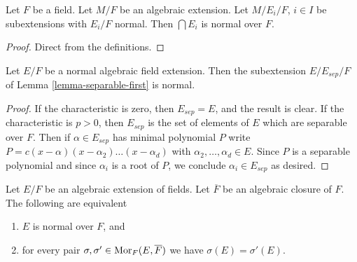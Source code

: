 \begin{lemma}
\label{lemma-intersect-normal}
Let $F$ be a field. Let $M/F$ be an algebraic extension. Let
$M/E_i/F$, $i \in I$ be subextensions with
$E_i/F$ normal. Then $\bigcap E_i$ is normal over $F$.
\end{lemma}

\begin{proof}
Direct from the definitions.
\end{proof}

\begin{lemma}
\label{lemma-separable-first-normal}
Let $E/F$ be a normal algebraic field extension. Then the subextension
$E/E_{sep}/F$ of Lemma \ref{lemma-separable-first} is normal.
\end{lemma}

\begin{proof}
If the characteristic is zero, then $E_{sep} = E$, and the result
is clear. If the characteristic is $p > 0$, then $E_{sep}$
is the set of elements of $E$ which are separable over $F$.
Then if $\alpha \in E_{sep}$ has minimal polynomial $P$
write $P = c(x - \alpha)(x - \alpha_2) \ldots (x - \alpha_d)$
with $\alpha_2, \ldots, \alpha_d \in E$. Since
$P$ is a separable polynomial and since $\alpha_i$
is a root of $P$, we conclude $\alpha_i \in E_{sep}$ as desired.
\end{proof}

\begin{lemma}
\label{lemma-characterize-normal}
Let $E/F$ be an algebraic extension of fields. Let $\overline{F}$ be an
algebraic closure of $F$. The following are equivalent
\begin{enumerate}
\item $E$ is normal over $F$, and
\item for every pair $\sigma, \sigma' \in \mathop{\mathrm{Mor}}\nolimits_F(E, \overline{F})$ we
have $\sigma(E) = \sigma'(E)$.
\end{enumerate}
\end{lemma}

